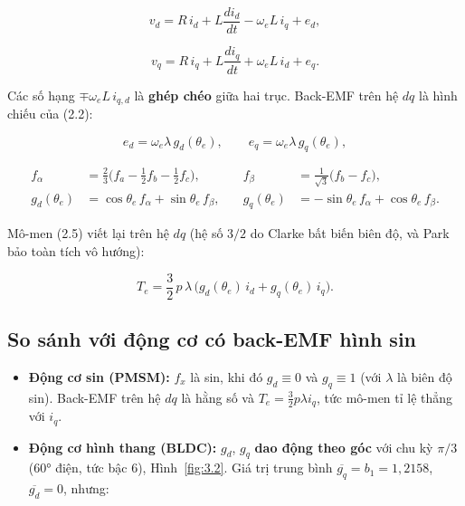 \begin{equation}
v_d = R\,i_d + L\frac{di_d}{dt} - \omega_e L\, i_q + e_d,
\tag{3.3}\label{eq:3.3}
\end{equation}

\begin{equation}
v_q = R\,i_q + L\frac{di_q}{dt} + \omega_e L\, i_d + e_q.
\tag{3.4}\label{eq:3.4}
\end{equation}

Các số hạng $\mp\omega_e L\, i_{q,d}$ là \textbf{ghép chéo} giữa hai trục. Back-EMF trên hệ $dq$ là hình chiếu của (2.2):

\begin{equation}
e_d = \omega_e\lambda\, g_d(\theta_e), \qquad e_q = \omega_e\lambda\, g_q(\theta_e),
\tag{3.5}\label{eq:3.5}
\end{equation}

\begin{equation}
\boxed{\;
\begin{aligned}
f_\alpha &= \tfrac23\big(f_a - \tfrac12 f_b - \tfrac12 f_c\big), &\quad f_\beta &= \tfrac{1}{\sqrt3}\big(f_b - f_c\big),\\
g_d(\theta_e) &= \cos\theta_e\, f_\alpha + \sin\theta_e\, f_\beta, &\quad g_q(\theta_e) &= -\sin\theta_e\, f_\alpha + \cos\theta_e\, f_\beta .
\end{aligned}\;}
\tag{3.6}\label{eq:3.6}
\end{equation}

Mô-men (2.5) viết lại trên hệ $dq$ (hệ số $3/2$ do Clarke bất biến biên độ, và Park bảo toàn tích vô hướng):

\begin{equation}
T_e = \frac32\,p\,\lambda\,\big(g_d(\theta_e)\, i_d + g_q(\theta_e)\, i_q\big).
\tag{3.7}\label{eq:3.7}
\end{equation}

\subsection{So sánh với động cơ có back-EMF hình sin}\label{sec:3.4}

\begin{itemize}[leftmargin=*]
\item \textbf{Động cơ sin (PMSM):} $f_x$ là sin, khi đó $g_d \equiv 0$ và $g_q \equiv 1$ (với $\lambda$ là biên độ sin). Back-EMF trên hệ $dq$ là hằng số và $T_e = \tfrac32 p\lambda i_q$, tức mô-men tỉ lệ thẳng với $i_q$.
\item \textbf{Động cơ hình thang (BLDC):} $g_d$, $g_q$ \textbf{dao động theo góc} với chu kỳ $\pi/3$ (60° điện, tức bậc 6), Hình~\ref{fig:3.2}. Giá trị trung bình $\overline{g_q} = b_1 = 1{,}2158$, $\overline{g_d}=0$, nhưng:
\end{itemize}

